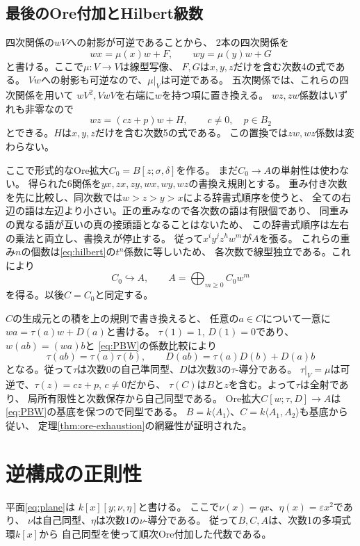 \documentclass[11pt,a4paper]{ltjsarticle}
\theoremstyle{definition}
\begin{document}
\subsection{最後のOre付加とHilbert級数}
四次関係の$wV$への射影が可逆であることから、
2本の四次関係を
\[
wx=\mu(x)w+F,\qquad wy=\mu(y)w+G
\]
と書ける。ここで$\mu:V\to V$は線型写像、
$F,G$は$x,y,z$だけを含む次数4の式である。
$Vw$への射影も可逆なので、$\mu|_V$は可逆である。
五次関係では、これらの四次関係を用いて
$wV^2,VwV$を右端に$w$を持つ項に置き換える。
$wz,zw$係数はいずれも非零なので
\[
wz=(cz+p)w+H,\qquad c\ne0,\quad p\in B_2
\]
とできる。$H$は$x,y,z$だけを含む次数5の式である。
この置換では$zw,wz$係数は変わらない。

ここで形式的なOre拡大$C_0=B[z;\sigma,\delta]$を作る。
まだ$C_0\to A$の単射性は使わない。
得られた6関係を$yx,zx,zy,wx,wy,wz$の書換え規則とする。
重み付き次数を先に比較し、同次数では$w>z>y>x$による辞書式順序を使うと、
全ての右辺の語は左辺より小さい。正の重みなので各次数の語は有限個であり、
同重みの異なる語が互いの真の接頭語となることはないため、
この辞書式順序は左右の乗法と両立し、書換えが停止する。
従って$x^iy^jz^hw^m$が$A$を張る。
これらの重み$n$の個数は\eqref{eq:hilbert}の$t^n$係数に等しいため、
各次数で線型独立である。これにより
\begin{equation}\label{eq:PBW}
C_0\hookrightarrow A,\qquad A=\bigoplus_{m\geq0}C_0w^m
\end{equation}
を得る。以後$C=C_0$と同定する。

$C$の生成元との積を上の規則で書き換えると、
任意の$a\in C$について一意に
$wa=\tau(a)w+D(a)$と書ける。
$\tau(1)=1$, $D(1)=0$であり、$w(ab)=(wa)b$と
\eqref{eq:PBW}の係数比較により
\[
\tau(ab)=\tau(a)\tau(b),\qquad
D(ab)=\tau(a)D(b)+D(a)b
\]
となる。従って$\tau$は次数0の自己準同型、$D$は次数3の$\tau$-導分である。
$\tau|_V=\mu$は可逆で、$\tau(z)=cz+p$, $c\ne0$だから、
$\tau(C)$は$B$と$z$を含む。よって$\tau$は全射であり、
局所有限性と次数保存から自己同型である。
Ore拡大$C[w;\tau,D]\to A$は\eqref{eq:PBW}の基底を保つので同型である。
$B=k\langle A_1\rangle$、$C=k\langle A_1,A_2\rangle$も基底から従い、
定理\ref{thm:ore-exhaustion}の網羅性が証明された。

\section{逆構成の正則性}\label{sec:converse}
平面\eqref{eq:plane}は
$k[x][y;\nu,\eta]$と書ける。
ここで$\nu(x)=qx$、$\eta(x)=\varepsilon x^2$であり、
$\nu$は自己同型、$\eta$は次数1の$\nu$-導分である。
従って$B,C,A$は、次数1の多項式環$k[x]$から
自己同型を使って順次Ore付加した代数である。
\end{document}
